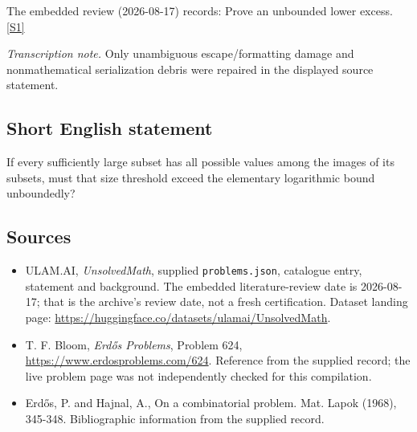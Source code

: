 \documentclass[11pt,a4paper]{article}
\newcommand{\sref}[2]{\hyperlink{source:#1:#2}{[S#2]}}
\begin{document}
The embedded review (2026-08-17) records: Prove an unbounded lower excess. \sref{statement}{1}

{\small\emph{Transcription note.} Only unambiguous escape/formatting damage and nonmathematical serialization debris were repaired in the displayed source statement.}

\subsection{Short English statement}

If every sufficiently large subset has all possible values among the images of its subsets, must that size threshold exceed the elementary logarithmic bound unboundedly?

\subsection{Sources}

{\small

\begin{itemize}

\item[\hypertarget{source:statement:1}{S1}] ULAM.AI, \emph{UnsolvedMath}, supplied \texttt{problems.json}, catalogue entry, statement and background. The embedded literature-review date is 2026-08-17; that is the archive’s review date, not a fresh certification. Dataset landing page: \url{https://huggingface.co/datasets/ulamai/UnsolvedMath}.

\item[\hypertarget{source:statement:2}{S2}] T. F. Bloom, \emph{Erdős Problems}, Problem 624, \url{https://www.erdosproblems.com/624}. Reference from the supplied record; the live problem page was not independently checked for this compilation.

\item[\hypertarget{source:statement:3}{S3}] Erd\H{o}s, P. and Hajnal, A., On a combinatorial problem. Mat. Lapok (1968), 345-348. Bibliographic information from the supplied record.

\end{itemize}

}

\label{end:statement}
\end{document}
